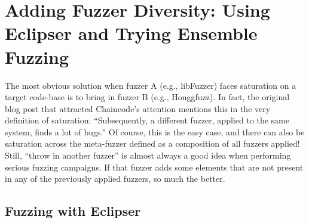 \section{Adding Fuzzer Diversity: Using Eclipser and Trying Ensemble Fuzzing}

The most obvious solution when fuzzer A (e.g., libFuzzer) faces saturation on a target code-base is to bring in fuzzer B (e.g., Honggfuzz).  In fact, the original blog post that attracted Chaincode's attention mentions this in the very definition of saturation:  ``Subsequently, a different fuzzer, applied to the same system, finds a lot of bugs.''  Of course, this is the easy case, and there can also be saturation across the meta-fuzzer defined as a composition of all fuzzers applied!  Still, ``throw in another fuzzer'' is almost always a good idea when performing serious fuzzing campaigns.  If that fuzzer adds some elements that are not present in any of the previously applied fuzzers, so much the better.

\subsection{Fuzzing with Eclipser}

